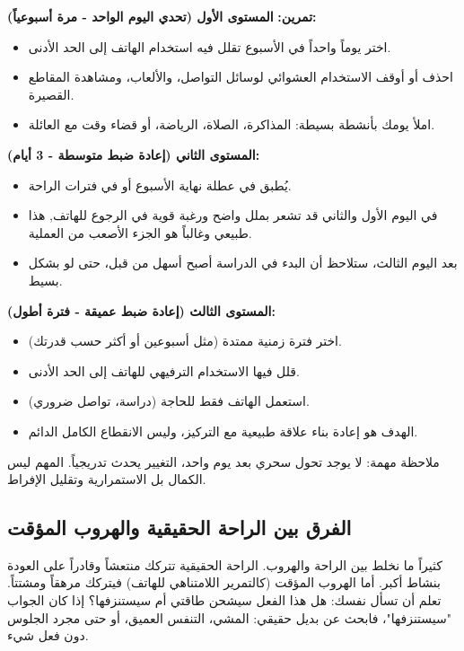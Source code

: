 \documentclass[12pt,a4paper]{book}
\newcommand{\exerciseAr}[1]{%
	\begin{exercise}
		\textbf{تمرين:} #1
	\end{exercise}
}
\begin{document}
\exerciseAr{ 
	\newline
	\textbf{المستوى الأول (تحدي اليوم الواحد - مرة أسبوعياً):}
	\begin{itemize}
		\item اختر يوماً واحداً في الأسبوع تقلل فيه استخدام الهاتف إلى الحد الأدنى.
		\item احذف أو أوقف الاستخدام العشوائي لوسائل التواصل، والألعاب، ومشاهدة المقاطع القصيرة.
		\item املأ يومك بأنشطة بسيطة: المذاكرة، الصلاة، الرياضة، أو قضاء وقت مع العائلة.
	\end{itemize}
	
	\textbf{المستوى الثاني (إعادة ضبط متوسطة - 3 أيام):}
	\begin{itemize}
		\item يُطبق في عطلة نهاية الأسبوع أو في فترات الراحة.
		\item في اليوم الأول والثاني قد تشعر بملل واضح ورغبة قوية في الرجوع للهاتف, هذا طبيعي وغالباً هو الجزء الأصعب من العملية.
		\item بعد اليوم الثالث، ستلاحظ أن البدء في الدراسة أصبح أسهل من قبل، حتى لو بشكل بسيط.
	\end{itemize}
	
	\textbf{المستوى الثالث (إعادة ضبط عميقة - فترة أطول):}
	\begin{itemize}
		\item اختر فترة زمنية ممتدة (مثل أسبوعين أو أكثر حسب قدرتك).
		\item قلل فيها الاستخدام الترفيهي للهاتف إلى الحد الأدنى.
		\item استعمل الهاتف فقط للحاجة (دراسة، تواصل ضروري).
		\item الهدف هو إعادة بناء علاقة طبيعية مع التركيز، وليس الانقطاع الكامل الدائم.
\end{itemize}}

ملاحظة مهمة: لا يوجد تحول سحري بعد يوم واحد، التغيير يحدث تدريجياً. المهم ليس الكمال بل الاستمرارية وتقليل الإفراط.

\subsection{الفرق بين الراحة الحقيقية والهروب المؤقت}

كثيراً ما نخلط بين الراحة والهروب. الراحة الحقيقية تتركك منتعشاً وقادراً على العودة بنشاط أكبر. أما الهروب المؤقت (كالتمرير اللامتناهي للهاتف) فيتركك مرهقاً ومشتتاً. تعلم أن تسأل نفسك: هل هذا الفعل سيشحن طاقتي أم سيستنزفها؟ إذا كان الجواب "سيستنزفها"، فابحث عن بديل حقيقي: المشي، التنفس العميق، أو حتى مجرد الجلوس دون فعل شيء.
\end{document}
